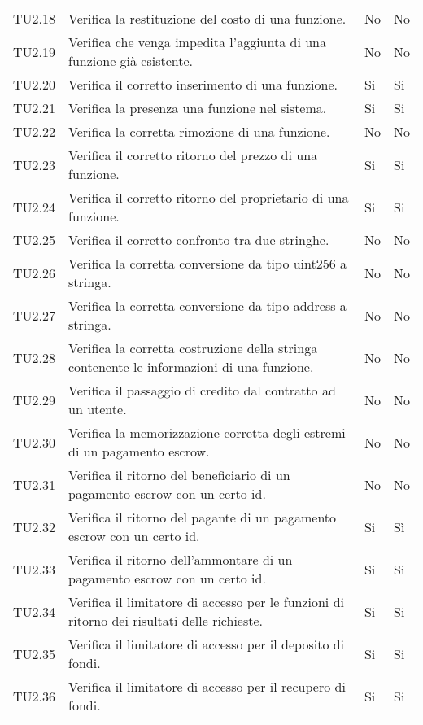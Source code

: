 \begin{longtable}{
		>{\centering}p{}
		>{}p{}
		>{\centering}p{}
		>{\centering}p{} }
TU2.18  &  Verifica la restituzione del costo di una funzione. &
No & No \tabularnewline

TU2.19  &  Verifica che venga impedita l'aggiunta di una funzione già esistente. &
No & No \tabularnewline

TU2.20  &  Verifica il corretto inserimento di una funzione. &%
Si & Si \tabularnewline

TU2.21  &  Verifica la presenza una funzione nel sistema.	&
Si & Si \tabularnewline

TU2.22  &  Verifica la corretta rimozione di una funzione. &
No & No \tabularnewline

TU2.23  &  Verifica il corretto ritorno del prezzo di una funzione. &
Si & Si \tabularnewline

TU2.24  &  Verifica il corretto ritorno del proprietario di una funzione. &
Si & Si \tabularnewline

TU2.25  &  Verifica il corretto confronto tra due stringhe. &
No & No \tabularnewline

TU2.26  &  Verifica la corretta conversione da tipo uint256 a stringa. &
No & No \tabularnewline

TU2.27  &  Verifica la corretta conversione da tipo address a stringa. &
No & No \tabularnewline

TU2.28  &  Verifica la corretta costruzione della stringa contenente le informazioni di una funzione. &
No & No \tabularnewline

TU2.29  &  Verifica il passaggio di credito dal contratto ad un utente. & %
No & No \tabularnewline

TU2.30  &  Verifica la memorizzazione corretta degli estremi di un pagamento escrow. &
No & No \tabularnewline

TU2.31  &  Verifica il ritorno del beneficiario di un pagamento escrow con un certo id. &
No & No \tabularnewline

TU2.32  &  Verifica il ritorno del pagante di un pagamento escrow con un certo id.  &
Si & Sì \tabularnewline

TU2.33  &  Verifica il ritorno dell'ammontare di un pagamento escrow con un certo id.  &
Si & Si \tabularnewline

TU2.34  &  Verifica il limitatore di accesso per le funzioni di ritorno dei risultati delle richieste.	&
Si & Si \tabularnewline

TU2.35  &  Verifica il limitatore di accesso per il deposito di fondi.	&
Si & Si \tabularnewline

TU2.36  &  Verifica il limitatore di accesso per il recupero di fondi.	&
Si & Si \tabularnewline



\end{longtable}
